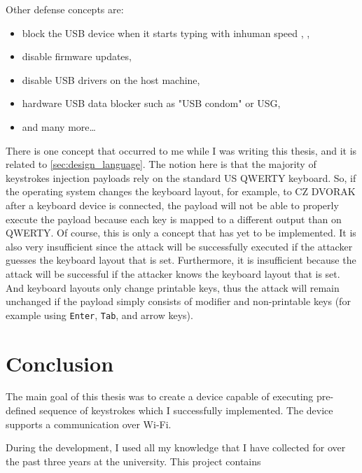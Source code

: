 Other defense concepts are:
\begin{itemize}
    \item block the USB device when it starts typing with inhuman speed \cite{KerschbaumFlorian2018UBUK}, \cite{arghire_2020},
    \item disable firmware updates,
    \item disable USB drivers on the host machine,
    \item hardware USB data blocker such as "USB condom"\cite{al-sibai_2023} or USG\cite{doctorow_2017},
    \item and many more\dots
\end{itemize}
There is one concept that occurred to me while I was writing this thesis, and it is related to \autoref{sec:design_language}. The notion here is that the majority of keystrokes injection payloads rely on the standard US QWERTY keyboard. So, if the operating system changes the keyboard layout, for example, to CZ DVORAK after a keyboard device is connected, the payload will not be able to properly execute the payload because each key is mapped to a different output than on QWERTY. Of course, this is only a concept that has yet to be implemented. It is also very insufficient since the attack will be successfully executed if the attacker guesses the keyboard layout that is set. Furthermore, it is insufficient because the attack will be successful if the attacker knows the keyboard layout that is set. And keyboard layouts only change printable keys, thus the attack will remain unchanged if the payload simply consists of modifier and non-printable keys (for example using \verb|Enter|, \verb|Tab|, and arrow keys).


\chapter{Conclusion}
\label{ch:conclusion}

The main goal of this thesis was to create a device capable of executing pre-defined sequence of keystrokes which I successfully implemented. The device supports a communication over Wi-Fi.

During the development, I used all my knowledge that I have collected for over the past three years at the university. This project contains
